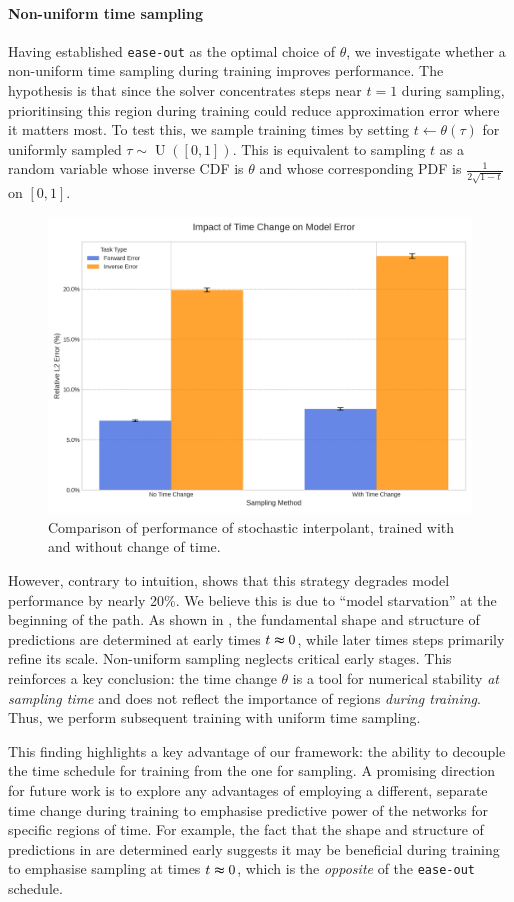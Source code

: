 \paragraph{Non-uniform time sampling}
Having established \texttt{ease-out} as the optimal choice of \(\theta\), we investigate whether a non-uniform time sampling during training improves performance. The hypothesis is that since the solver concentrates steps near \(t=1\) during sampling, prioritinsing this region during training could reduce approximation error where it matters most. To test this, we sample training times by setting \(t \leftarrow \theta(\tau)\) for uniformly sampled \(\tau \sim \operatorname{U}([0, 1])\). This is equivalent to sampling \(t\) as a random variable whose inverse CDF is \(\theta\) and whose corresponding PDF is \(\frac{1}{2\sqrt{1-t}}\) on \([0, 1]\).
\begin{figure}[htbp]
\centering
\includegraphics[width=0.5\linewidth]{darcy_1d_tcc.png}
\caption{Comparison of performance of stochastic interpolant, trained with and without change of time.}\label{fig:tcc}
\end{figure}

However, contrary to intuition,  shows that this strategy degrades model performance by nearly 20\%. We believe this is due to ``model starvation'' at the beginning of the path. As shown in ,  the fundamental shape and structure of predictions are determined at early times \(t \thickapprox 0\), while later times steps primarily refine its scale. Non-uniform sampling neglects critical early stages. This reinforces a key conclusion: the time change \(\theta\) is a tool for numerical stability \textit{at sampling time} and does not reflect the importance of regions \textit{during training}. Thus, we perform subsequent training with uniform time sampling.

This finding highlights a key advantage of our framework: the ability to decouple the time schedule for training from the one for sampling. A promising direction for future work is to explore any advantages of employing a different, separate time change during training to emphasise predictive power of the networks for specific regions of time. For example, the fact that the shape and structure of predictions in  are determined early suggests it may be beneficial during training to emphasise sampling at times \(t \thickapprox 0\), which is the \textit{opposite} of the \texttt{ease-out} schedule.

